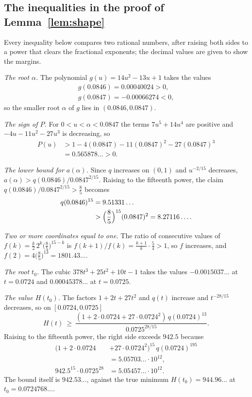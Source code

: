 \documentclass[11pt]{amsart}
\theoremstyle{definition}
\theoremstyle{remark}
\begin{document}
\subsection{The inequalities in the proof of Lemma~\ref{lem:shape}}

Every inequality below compares two rational numbers, after raising both
sides to a power that clears the fractional exponents; the decimal values
are given to show the margins.

\emph{The root $\alpha$.} The polynomial $g(u)=14u^2-13u+1$ takes the
values
\begin{gather*}
 g(0.0846)=0.00040024>0,\\
 g(0.0847)=-0.00066274<0,
\end{gather*}
so the smaller root $\alpha$ of $g$ lies in $(0.0846,0.0847)$.

\emph{The sign of $P$.} For $0<u<\alpha<0.0847$ the terms $7u^5+14u^4$ are
positive and $-4u-11u^2-27u^3$ is decreasing, so
\begin{align*}
 P(u)&>1-4(0.0847)-11(0.0847)^2-27(0.0847)^3\\
 &=0.565878\ldots>0 .
\end{align*}

\emph{The lower bound for $a(\alpha)$.} Since $q$ increases on $(0,1)$ and
$u^{-2/15}$ decreases, $a(\alpha)>q(0.0846)/0.0847^{2/15}$. Raising to the
fifteenth power, the claim $q(0.0846)/0.0847^{2/15}>\frac85$ becomes
\begin{align*}
 q(0.0846)^{15}&=9.51331\ldots\\
 &>\Bigl(\frac85\Bigr)^{15}(0.0847)^2=8.27116\ldots .
\end{align*}

\emph{Two or more coordinates equal to one.} The ratio of consecutive
values of $f(k)=\frac k2\,2^k\bigl(\frac85\bigr)^{15-k}$ is
$f(k+1)/f(k)=\frac{k+1}k\cdot\frac54>1$, so $f$ increases, and
$f(2)=4\bigl(\frac85\bigr)^{13}=1801.43\ldots$.

\emph{The root $t_0$.} The cubic $378t^3+25t^2+10t-1$ takes the values
$-0.0015037\ldots$ at $t=0.0724$ and $0.00045378\ldots$ at $t=0.0725$.

\emph{The value $H(t_0)$.} The factors $1+2t+27t^2$ and $q(t)$ increase
and $t^{-28/15}$ decreases, so on $[0.0724,0.0725]$
\[
 H(t)\ \ge\ \frac{(1+2\cdot0.0724+27\cdot0.0724^2)\,q(0.0724)^{13}}
 {0.0725^{28/15}} .
\]
Raising to the fifteenth power, the right side exceeds $942.5$ because
\begin{align*}
 (1+2\cdot0.0724&+27\cdot0.0724^2)^{15}\,q(0.0724)^{195}\\
 &=5.05703\ldots\cdot10^{12},\\
 942.5^{15}\cdot0.0725^{28}&=5.05457\ldots\cdot10^{12}.
\end{align*}
The bound itself is $942.53\ldots$, against the true minimum
$H(t_0)=944.96\ldots$ at $t_0=0.0724768\ldots$.
\end{document}
